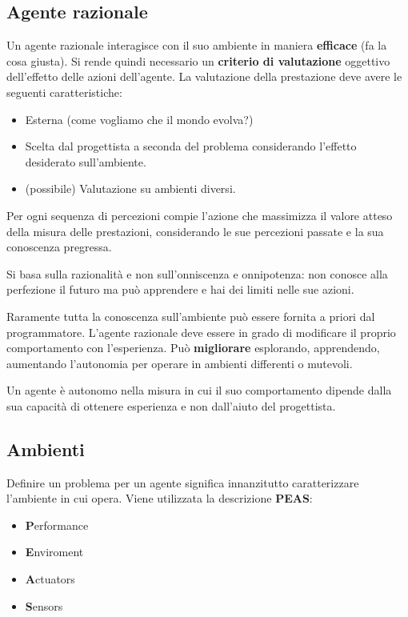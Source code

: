 \subsection{Agente razionale}
Un agente razionale interagisce con il suo ambiente in maniera \textbf{efficace} (fa la cosa giusta).
Si rende quindi necessario un \textbf{criterio di valutazione} oggettivo dell'effetto delle azioni dell'agente. La valutazione della prestazione deve avere le seguenti caratteristiche:
\begin{itemize}
	\item Esterna (come vogliamo che il mondo evolva?)
	\item Scelta dal progettista a seconda del problema considerando l'effetto desiderato sull'ambiente.
	\item (possibile) Valutazione su ambienti diversi.
\end{itemize}
\begin{definition}
	Per ogni sequenza di percezioni compie l’azione che massimizza il valore atteso della
	misura delle prestazioni, considerando le sue percezioni passate e la sua conoscenza pregressa.
\end{definition}
\begin{observation}
	Si basa sulla razionalità e non sull'onniscenza e onnipotenza: non conosce alla perfezione il futuro ma può apprendere e hai dei limiti nelle sue azioni.
\end{observation}

Raramente tutta la conoscenza sull’ambiente può essere fornita a priori dal programmatore. L’agente razionale deve essere in grado di modificare il proprio comportamento con l’esperienza. Può \textbf{migliorare} esplorando, apprendendo, aumentando l'autonomia per operare in ambienti differenti o mutevoli.

\begin{definition}
	Un agente è autonomo nella misura in cui il suo comportamento dipende dalla sua
	capacità di ottenere esperienza e non dall’aiuto del progettista.
\end{definition}

\subsection{Ambienti}
Definire un problema per un agente significa innanzitutto caratterizzare l'ambiente in cui opera. Viene utilizzata la descrizione \textbf{PEAS}:
\begin{itemize}
	\item \textbf{P}erformance
	\item \textbf{E}nviroment
	\item \textbf{A}ctuators
	\item \textbf{S}ensors
\end{itemize}

